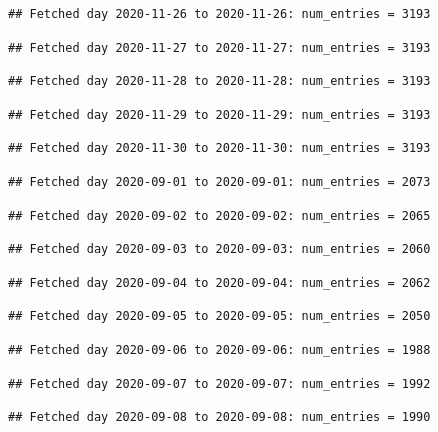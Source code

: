 \documentclass[]{article}
\begin{document}
\begin{verbatim}
## Fetched day 2020-11-26 to 2020-11-26: num_entries = 3193
\end{verbatim}

\begin{verbatim}
## Fetched day 2020-11-27 to 2020-11-27: num_entries = 3193
\end{verbatim}

\begin{verbatim}
## Fetched day 2020-11-28 to 2020-11-28: num_entries = 3193
\end{verbatim}

\begin{verbatim}
## Fetched day 2020-11-29 to 2020-11-29: num_entries = 3193
\end{verbatim}

\begin{verbatim}
## Fetched day 2020-11-30 to 2020-11-30: num_entries = 3193
\end{verbatim}

\begin{verbatim}
## Fetched day 2020-09-01 to 2020-09-01: num_entries = 2073
\end{verbatim}

\begin{verbatim}
## Fetched day 2020-09-02 to 2020-09-02: num_entries = 2065
\end{verbatim}

\begin{verbatim}
## Fetched day 2020-09-03 to 2020-09-03: num_entries = 2060
\end{verbatim}

\begin{verbatim}
## Fetched day 2020-09-04 to 2020-09-04: num_entries = 2062
\end{verbatim}

\begin{verbatim}
## Fetched day 2020-09-05 to 2020-09-05: num_entries = 2050
\end{verbatim}

\begin{verbatim}
## Fetched day 2020-09-06 to 2020-09-06: num_entries = 1988
\end{verbatim}

\begin{verbatim}
## Fetched day 2020-09-07 to 2020-09-07: num_entries = 1992
\end{verbatim}

\begin{verbatim}
## Fetched day 2020-09-08 to 2020-09-08: num_entries = 1990
\end{verbatim}
\end{document}
